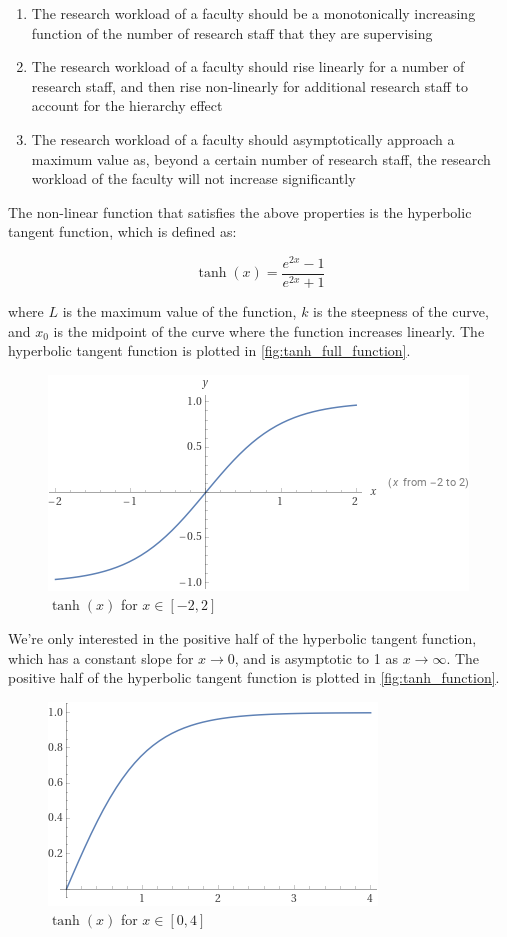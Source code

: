 \begin{enumerate}

  \item The research workload of a faculty should be a monotonically increasing function of the number of research staff that they are supervising
  \item The research workload of a faculty should rise linearly for a number of research staff, and then rise non-linearly for additional research staff to account for the hierarchy effect
  \item The research workload of a faculty should asymptotically approach a maximum value as, beyond a certain number of research staff, the research workload of the faculty will not increase significantly

\end{enumerate}

The non-linear function that satisfies the above properties is the hyperbolic tangent function, which is defined as:

\begin{equation*}
  \tanh(x) = \frac{e^{2x} - 1}{e^{2x} + 1}
\end{equation*}

where $L$ is the maximum value of the function, $k$ is the steepness of the curve, and $x_0$ is the midpoint of the curve where the function increases linearly. The hyperbolic tangent function is plotted in \autoref{fig:tanh_full_function}.

\begin{figure}[htpb]
  \centering
  \includegraphics[width=0.5\linewidth]{images/tanh_fullplot.png}
  \caption{\(\tanh(x)\) for \(x \in [-2, 2]\)}
  \label{fig:tanh_full_function}
\end{figure}

We're only interested in the positive half of the hyperbolic tangent function, which has a constant slope for $x \to 0$, and is asymptotic to 1 as $x \to \infty$. The positive half of the hyperbolic tangent function is plotted in \autoref{fig:tanh_function}.

\begin{figure}[htpb]
  \centering
  \includegraphics[width=0.5\linewidth]{images/tanh_plot.png}
  \caption{\(\tanh(x)\) for \(x \in [0, 4]\)}
  \label{fig:tanh_function}
\end{figure}


